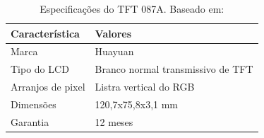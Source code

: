 \begin{enumerate}
\begin{table}[ht]
\caption{Especificações do TFT 087A. Baseado em: \cite{monitor_lcd}}
\centering
\begin{tabular}{| l |  p{10cm} |}
\hline
Característica & Valores \\
\hline
Marca & Huayuan \\
\hline
Tipo do LCD & Branco normal transmissivo de TFT \\
\hline
Arranjos de pixel & Listra vertical do RGB \\
\hline
Dimensões & 120,7x75,8x3,1 mm \\
\hline
Garantia & 12 meses \\
\hline
\end{tabular}
\label{table:table_tft87a}
\end{table}

\end{enumerate}
